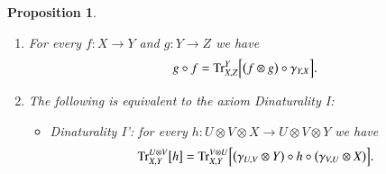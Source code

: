 \documentclass{amsart}
\def\tn{\textnormal}
\def\Trace{\tn{Tr}}
\def\to{\rightarrow}
\newtheorem{proposition}[subsection]{Proposition}
\theoremstyle{remark}
\theoremstyle{definition}
\begin{document}
\begin{proposition}\label{prop:dinaturality}\mbox{}
\begin{enumerate}
 \item For every $f:X\to Y$ and $g:Y\to Z$ we have
 \[g\circ f=\Trace^Y_{X,Z}\Big[\big(f\otimes g\big)\circ\gamma_{Y,X}\Big].\]
 \item The following is equivalent to the axiom Dinaturality I:
 \begin{itemize}
  \item Dinaturality I': for every $h:U\otimes V\otimes X\to U\otimes V\otimes Y$ we have
 \[\Trace^{U\otimes V}_{X,Y}\big[h\big]=\Trace^{V\otimes U}_{X,Y}\Big[\big(\gamma_{U,V}\otimes Y\big)\circ h\circ\big(\gamma_{V,U}\otimes X\big)\Big].\]
 \end{itemize}
\end{enumerate}
\end{proposition}
\end{document}
